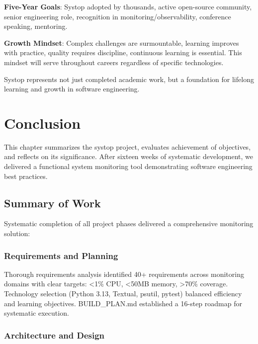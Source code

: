 \documentclass[12pt,a4paper,oneside]{report}
\begin{document}
\textbf{Five-Year Goals}: Systop adopted by thousands, active open-source community, senior engineering role, recognition in monitoring/observability, conference speaking, mentoring.

\textbf{Growth Mindset}: Complex challenges are surmountable, learning improves with practice, quality requires discipline, continuous learning is essential. This mindset will serve throughout careers regardless of specific technologies.

Systop represents not just completed academic work, but a foundation for lifelong learning and growth in software engineering.

\chapter{Conclusion}
\label{chap:conclusion}

This chapter summarizes the systop project, evaluates achievement of objectives, and reflects on its significance. After sixteen weeks of systematic development, we delivered a functional system monitoring tool demonstrating software engineering best practices.

\section{Summary of Work}
\label{sec:summary}

Systematic completion of all project phases delivered a comprehensive monitoring solution:

\subsection{Requirements and Planning}

Thorough requirements analysis identified 40+ requirements across monitoring domains with clear targets: <1\% CPU, <50MB memory, >70\% coverage. Technology selection (Python 3.13, Textual, psutil, pytest) balanced efficiency and learning objectives. BUILD\_PLAN.md established a 16-step roadmap for systematic execution.

\subsection{Architecture and Design}
\end{document}
